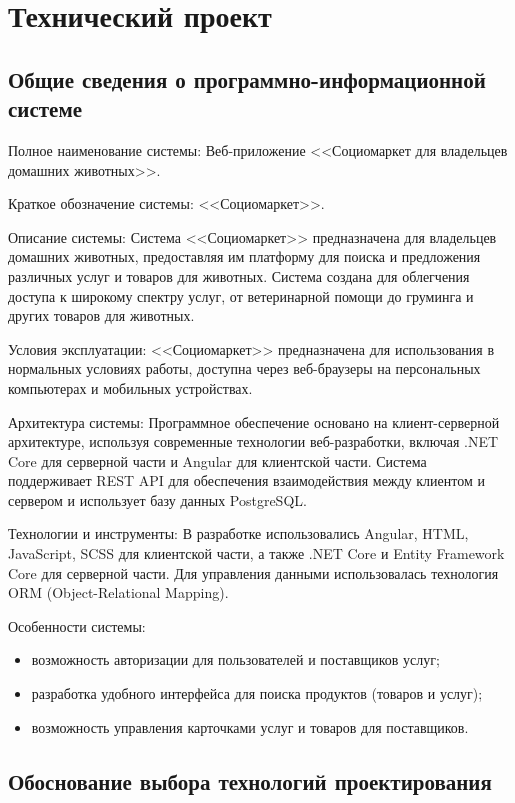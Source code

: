 \section{Технический проект}

\subsection{Общие сведения о программно-информационной системе}

Полное наименование системы: Веб-приложение <<Социомаркет для владельцев домашних животных>>.

Краткое обозначение системы: <<Социомаркет>>.

Описание системы: Система <<Социомаркет>> предназначена для владельцев домашних животных, предоставляя им платформу для поиска и предложения различных услуг и товаров для животных. Система создана для облегчения доступа к широкому спектру услуг, от ветеринарной помощи до груминга и других товаров для животных.

Условия эксплуатации: <<Социомаркет>> предназначена для использования в нормальных условиях работы, доступна через веб-браузеры на персональных компьютерах и мобильных устройствах.

Архитектура системы: Программное обеспечение основано на клиент-серверной архитектуре, используя современные технологии веб-разработки, включая .NET Core для серверной части и Angular для клиентской части. Система поддерживает REST API для обеспечения взаимодействия между клиентом и сервером и использует базу данных PostgreSQL.

Технологии и инструменты: В разработке использовались Angular, HTML, JavaScript, SCSS для клиентской части, а также .NET Core и Entity Framework Core для серверной части. Для управления данными использовалась технология ORM (Object-Relational Mapping).

Особенности системы:
\begin{itemize}
    \item возможность авторизации для пользователей и поставщиков услуг;
    \item разработка удобного интерфейса для поиска продуктов (товаров и услуг);
    \item возможность управления карточками услуг и товаров для поставщиков.
\end{itemize}

\subsection{Обоснование выбора технологий проектирования}
